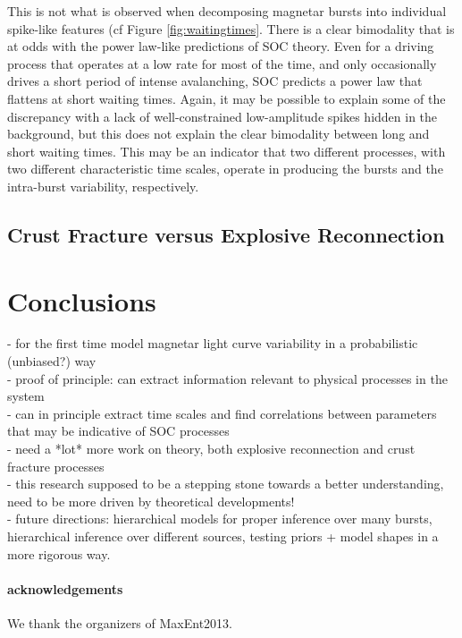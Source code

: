 \documentclass[12pt]{emulateapj}
\begin{document}
This is not what is observed when decomposing magnetar bursts into individual spike-like features (cf Figure \ref{fig:waitingtimes}. There is a
clear bimodality that is at odds with the power law-like predictions of SOC theory. Even for a driving process that operates at a low
rate for most of the time, and only occasionally drives a short period of intense avalanching, SOC predicts a power law that flattens at short
waiting times. Again, it may be possible to explain some of the discrepancy with a lack of well-constrained low-amplitude spikes hidden in 
the background, but this does not explain the clear bimodality between long and short waiting times. This may be an indicator that two different
processes, with two different characteristic time scales, operate in producing the bursts and the intra-burst variability, respectively. 


\subsection{Crust Fracture versus Explosive Reconnection}


\section{Conclusions}

- for the first time model magnetar light curve variability in a probabilistic (unbiased?) way \\
- proof of principle: can extract information relevant to physical processes in the system \\
- can in principle extract time scales and find correlations between parameters that may be
indicative of SOC processes \\
- need a *lot* more work on theory, both explosive reconnection and crust fracture processes \\
- this research supposed to be a stepping stone towards a better understanding, need to be
more driven by theoretical developments! \\
- future directions: hierarchical models for proper inference over many bursts, hierarchical inference
over different sources, testing priors + model shapes in a more rigorous way.


\paragraph{acknowledgements}
We thank the organizers of MaxEnt2013.
\clearpage



\end{document}
